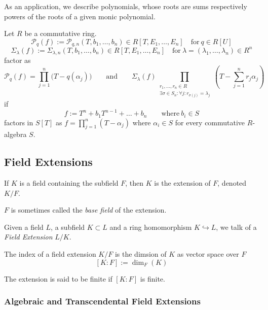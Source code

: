 As an application, we describe polynomials, whose roots are sums respectively powers of the roots of a given monic polynomial.
\begin{proposition}
   Let \(R\) be a commutative ring.
   \[\mathscr{P}_q(f) := \mathscr{P}_{q,n}(T, b_1, \ldots, b_n) \in R[T, E_1, \ldots, E_n] \quad\text{for}~q \in R[U]\]
   \[\Sigma_{\lambda}(f) := \Sigma_{\lambda, n}(T, b_1, \ldots, b_n) \in R[T, E_1, \ldots, E_n] \quad\text{for}~\lambda=(\lambda_1, \ldots, \lambda_n) \in R^n\]
   factor as
   \[\mathscr{P}_q(f) = \prod_{j=1}^n\big(T - q(\alpha_j)\big) \qquad\text{and}\qquad \Sigma_{\lambda}(f) \prod_{\substack{r_1, \ldots, r_n \in R\\\exists \sigma \in S_n: \forall j: r_{\sigma(j)} = \lambda_j}} \left(T - \sum_{j=1}^n r_j\alpha_j\right)\]
   if
   \[f := T^n + b_1T^{n-1} + \ldots + b_n \qquad\text{where}~b_i\in S\]
   factors in \(S[T]\) as \(f = \prod_{j=1}^n (T - \alpha_j)\) where \(\alpha_i \in S\) for every commutative \(R\)-algebra \(S\).
\end{proposition}

\subsection{Field Extensions}
\begin{definition}
   If \(K\) is a field containing the subfield \(F\), then \(K\) is the extension of \(F\), denoted \(K/F\).
\end{definition}
\begin{remark}[Terminology]
   \(F\) is sometimes called the \emph{base field} of the extension.
\end{remark}
\begin{remark}
   Given a field \(L\), a subfield \(K \subset L\) and a ring homomorphism \(K \hookrightarrow L\), we talk of a \emph{Field Extension} \(L/K\).
\end{remark}

\begin{definition}
   The index of a field extension \(K/F\) is the dimsion of \(K\) as vector space over \(F\)
   \[[K:F] := \dim_F(K)\]
\end{definition}
\begin{remark}[Terminology]
   The extension is said to be finite if \([K:F]\) is finite.
\end{remark}

\subsubsection{Algebraic and Transcendental Field Extensions}


